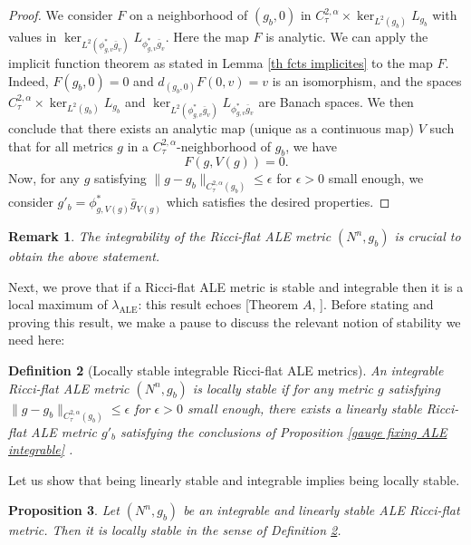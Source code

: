 \documentclass[a4paper,11pt,reqno]{amsart}
\newtheorem{defn}{Definition}[section]
\newtheorem{prop}[defn]{Proposition}
\newtheorem{rk}[defn]{Remark}
\numberwithin{equation}{section}
\begin{document}
\begin{proof}
		We consider $F$ on a neighborhood of $(g_b,0)$ in $C^{2,\alpha}_\tau\times \ker_{L^2(g_b)}L_{g_b}$ with values in \newline$\ker_{L^2(\phi_{g,v}^*\bar{g}_v)}L_{\phi_{g,v}^*\bar{g}_v}$. Here the map $F$ is analytic. We can apply the implicit function theorem as stated in Lemma \ref{th fcts implicites} to the map $F$. Indeed, $F(g_b,0)=0$ and $d_{(g_b,0)}F(0,v) = v$ is an isomorphism, and the spaces $C^{2,\alpha}_\tau\times \ker_{L^2(g_b)}L_{g_b}$ and $\ker_{L^2(\phi_{g,v}^*\bar{g}_v)}L_{\phi_{g,v}^*\bar{g}_v}$ are Banach spaces. We then conclude that there exists an analytic map (unique as a continuous map) $V$ such that for all metrics $g$ in a $C^{2,\alpha}_\tau$-neighborhood of $g_b$, we have 
		$$ F(g,V(g))=0. $$
		Now, for any $g$ satisfying $ \|g-g_b\|_{C^{2,\alpha}_\tau(g_b)}\leq \epsilon $ for $\epsilon>0$ small enough, we consider $g'_b = \phi_{g,V(g)}^*\bar{g}_{V(g)}$ which satisfies the desired properties.
	\end{proof}
	\begin{rk}
		The integrability of the Ricci-flat ALE metric $(N^n,g_b)$ is crucial to obtain the above statement. 
	\end{rk}
	
	Next, we prove that if a Ricci-flat ALE metric is stable and integrable then it is a local maximum of $\lambda_{\operatorname{ALE}}$: this result echoes [Theorem $A$, \cite{Has-Sta}]. Before stating and proving this result, we make a pause to discuss the relevant notion of stability we need here: 
	\begin{defn}[Locally stable integrable Ricci-flat ALE metrics]\label{definition integrable-loc-stable}
		An integrable Ricci-flat ALE metric $(N^n,g_b)$ is \emph{locally stable} if for any metric $g$ satisfying $ \|g-g_b\|_{C^{2,\alpha}_\tau(g_b)}\leq \epsilon $ for $\epsilon>0$ small enough, there exists a linearly stable Ricci-flat ALE metric $ g'_b $ satisfying the conclusions of Proposition \ref{gauge fixing ALE integrable} .
			\end{defn}
			
	Let us show that being linearly stable and integrable implies being locally stable.
		
	\begin{prop}\label{prop-int-lin-sta-loc-sta}
	Let $(N^n,g_b)$ be an integrable and linearly stable ALE Ricci-flat metric. Then it is locally stable in the sense of Definition \ref{definition integrable-loc-stable}.
	\end{prop}
	
\end{document}
